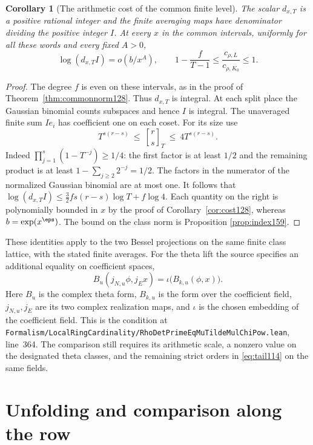 \documentclass[a4paper,11pt]{article}
\newtheorem{corollary}[proposition]{Corollary}
\theoremstyle{definition}
\theoremstyle{remark}
\newcommand{\srcloc}[2]{{\small\nolinkurl{#1.lean}}, line~#2}
\numberwithin{equation}{section}
\begin{document}
\begin{corollary}[The arithmetic cost of the common finite level]
\label{cor:integral160}
The scalar \(d_{x,T}\) is a positive rational integer and the
finite averaging maps have denominator dividing the positive
integer \(I\). At every \(x\) in the common intervals,
uniformly for all these words and every fixed \(A>0\),
\[
       \log(d_{x,T}I)=o(b/x^A),\qquad
       1-\frac{f}{T-1}\le
          \frac{c_{\rho,L}}{c_{\rho,K_0}}\le1 .
\]
\end{corollary}
\begin{proof}
The degree \(f\) is even on these intervals, as in the
proof of Theorem~\ref{thm:commonnorm128}. Thus \(d_{x,T}\)
is integral. At each split place the Gaussian binomial counts
subspaces and hence \(I\) is integral. The unaveraged finite
sum \(Ie_i\) has coefficient one on each coset. For its size
use
\[
   T^{s(r-s)}\ \le\ {r\brack s}_T\ \le\ 4T^{s(r-s)} .
\]
Indeed \(\prod_{j=1}^s (1-T^{-j})\ge1/4\): the first factor
is at least \(1/2\) and the remaining product is at least
\(1-\sum_{j\ge2}2^{-j}=1/2\). The factors in the numerator
of the normalized Gaussian binomial are at most one.
It follows that \(\log(d_{x,T} I)\le
\tfrac32 fs(r-s)\log T+f\log 4\). Each quantity on the
right is polynomially bounded in \(x\) by the proof of
Corollary~\ref{cor:cost128}, whereas \(b=\exp(x^\eps)\).
The bound on the class norm is Proposition \ref{prop:index159}.
\end{proof}

These identities apply to the two Bessel projections on the
same finite class lattice, with the stated finite averages.
For the theta lift the source specifies an additional equality
on coefficient spaces,
\[
     B_u(j_{N,u}\phi,j_E x)=\iota\bigl(B_{k,u}(\phi,x)\bigr).
\]
Here \(B_u\) is the complex theta form, \(B_{k,u}\) is the
form over the coefficient field, \(j_{N,u},j_E\) are its
two complex realization maps, and \(\iota\) is the chosen
embedding of the coefficient field. This is the condition at
\srcloc{Formalism/LocalRingCardinality/RhoDetPrimeEqMuTildeMulChiPow}{364}.
The comparison still requires its arithmetic scale, a nonzero
value on the designated theta classes, and the remaining
strict orders in \eqref{eq:tail114} on the same fields.

\section{Unfolding and comparison along the row}\label{nav:g-VII-2}
\end{document}
